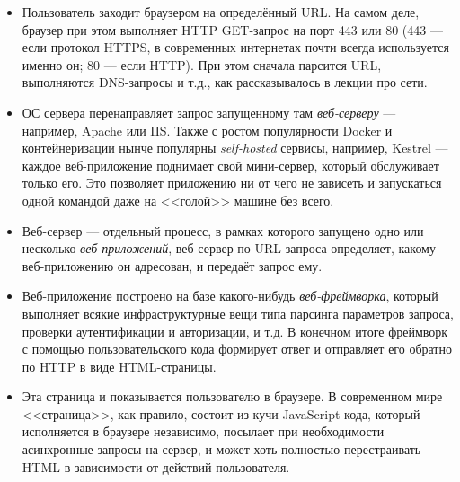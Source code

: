 \documentclass[a5paper]{article}
\begin{document}
\begin{itemize}
    \item Пользователь заходит браузером на определённый URL. На самом деле, браузер при этом выполняет HTTP GET-запрос на порт 443 или 80 (443 --- если протокол HTTPS, в современных интернетах почти всегда используется именно он; 80 --- если HTTP). При этом сначала парсится URL, выполняются DNS-запросы и т.д., как рассказывалось в лекции про сети.
    \item ОС сервера перенаправляет запрос запущенному там \emph{веб-серверу} --- например, Apache или IIS. Также с ростом популярности Docker и контейнеризации нынче популярны \emph{self-hosted} сервисы, например, Kestrel --- каждое веб-приложение поднимает свой мини-сервер, который обслуживает только его. Это позволяет приложению ни от чего не зависеть и запускаться одной командой даже на <<голой>> машине без всего.
    \item Веб-сервер --- отдельный процесс, в рамках которого запущено одно или несколько \emph{веб-приложений}, веб-сервер по URL запроса определяет, какому веб-приложению он адресован, и передаёт запрос ему.
    \item Веб-приложение построено на базе какого-нибудь \emph{веб-фреймворка}, который выполняет всякие инфраструктурные вещи типа парсинга параметров запроса, проверки аутентификации и авторизации, и т.д. В конечном итоге фреймворк с помощью пользовательского кода формирует ответ и отправляет его обратно по HTTP в виде HTML-страницы.
    \item Эта страница и показывается пользователю в браузере. В современном мире <<страница>>, как правило, состоит из кучи JavaScript-кода, который исполняется в браузере независимо, посылает при необходимости асинхронные запросы на сервер, и может хоть полностью перестраивать HTML в зависимости от действий пользователя.
\end{itemize}
\end{document}
